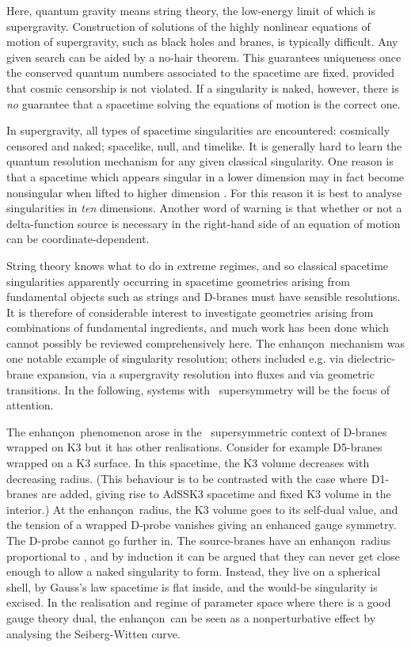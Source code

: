 \documentclass[a4paper,12pt]{amsproc}
\numberwithin{equation}{section}
\def\enh{enhan\c con}
\def\net{\myHighlight{$n{=}2$}\coordHE{}}
\begin{document}
Here, quantum gravity means string theory, the low-energy limit of
which is supergravity.  Construction of solutions of the highly
nonlinear equations of motion of supergravity, such as black holes and
branes, is typically difficult.  Any given search can be aided by a
no-hair theorem.  This guarantees uniqueness once the conserved
quantum numbers associated to the spacetime are fixed, provided that
cosmic censorship is not violated.  If a singularity is naked,
however, there is {\em no} guarantee that a spacetime solving the
equations of motion is the correct one.

In supergravity, all types of spacetime singularities are encountered:
cosmically censored and naked; spacelike, null, and timelike.  It is
generally hard to learn the quantum resolution mechanism for any given
classical singularity.  One reason is that a spacetime which appears
singular in a lower dimension may in fact become nonsingular when
lifted to higher dimension \cite{ght}.  For this reason it is best to
analyse singularities in {\em ten} dimensions.
%
Another word of warning is that whether or not a delta-function source
is necessary in the right-hand side of an equation of motion can be
coordinate-dependent.  

String theory knows what to do in extreme regimes, and so classical
spacetime singularities apparently occurring in spacetime geometries
arising from fundamental objects such as strings and D-branes must
have sensible resolutions.  It is therefore of considerable interest
to investigate geometries arising from combinations of fundamental
ingredients, and much work has been done which cannot possibly be
reviewed comprehensively here.  The \enh\ mechanism \cite{jpp} was one
notable example of singularity resolution; others included e.g.
\cite{polstr} via dielectric-brane expansion, \cite{klebstr} via a
supergravity resolution into fluxes and \cite{vaf} via geometric
transitions.  In the following, systems with \net\ supersymmetry will
be the focus of attention.

The \enh\ phenomenon \cite{jpp} arose in the \net\ supersymmetric
context of D-branes wrapped on K3 but it has other realisations.
Consider for example \coordHE{} D5-branes wrapped on a K3 surface.  In this
spacetime, the K3 volume decreases with decreasing radius.  (This
behaviour is to be contrasted with the case where \coordHE{} D1-branes
are added, giving rise to AdS\myHighlight{$_3\times$}\coordHE{}S\myHighlight{$^3\times$}\coordHE{}K3 spacetime and
fixed K3 volume in the interior.)  At the \enh\ radius, the K3 volume
goes to its self-dual value, and the tension of a wrapped D-probe
vanishes giving an enhanced gauge symmetry.  The D-probe cannot go
further in.  The \coordHE{} source-branes have an \enh\ radius proportional
to \coordHE{}, and by induction it can be argued that they can never get
close enough to allow a naked singularity to form.  Instead, they live
on a spherical shell, by Gauss's law spacetime is flat inside, and the
would-be singularity is excised.  In the realisation and regime of
parameter space where there is a good gauge theory dual, the \enh\ can
be seen as a nonperturbative effect by analysing the Seiberg-Witten
curve.
\end{document}
